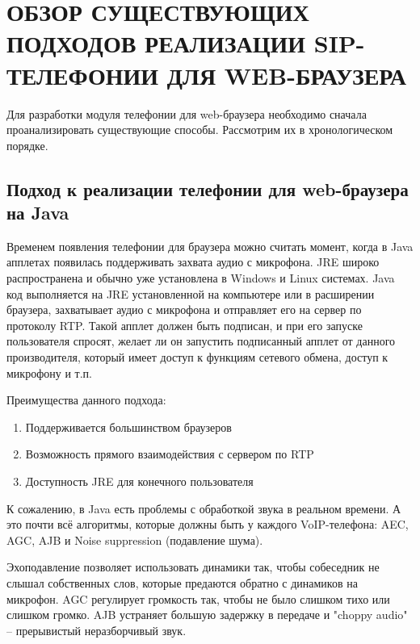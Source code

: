 \chapter{ОБЗОР СУЩЕСТВУЮЩИХ ПОДХОДОВ РЕАЛИЗАЦИИ SIP-ТЕЛЕФОНИИ ДЛЯ WEB-БРАУЗЕРА}
\label{chapter:analysis}

Для разработки модуля телефонии для web-браузера необходимо сначала проанализировать существующие способы. Рассмотрим их в хронологическом порядке.

\section{Подход к реализации телефонии для web-браузера на Java}

Временем появления телефонии для браузера можно считать момент, когда в Java апплетах появилась поддерживать захвата аудио с микрофона. JRE широко распространена и обычно уже установлена в Windows и Linux системах.\cite{webrtc_flash_java} Java код выполняется на JRE установленной на компьютере или в расширении браузера, захватывает аудио с микрофона и отправляет его на сервер по протоколу RTP. Такой апплет должен быть подписан, и при его запуске пользователя спросят, желает ли он запустить подписанный апплет от данного производителя, который имеет доступ к функциям сетевого обмена, доступ к микрофону и т.п.

Преимущества данного подхода:
\begin{enumerate}
\item Поддерживается большинством браузеров
\item Возможность прямого взаимодействия с сервером по RTP
\item Доступность JRE для конечного пользователя
\end{enumerate}

К сожалению, в Java есть проблемы с обработкой звука в реальном времени. А это почти всё алгоритмы, которые должны быть у каждого VoIP-телефона: AEC, AGC, AJB и Noise suppression (подавление шума).

Эхоподавление позволяет использовать динамики так, чтобы собеседник не слышал собственных слов, которые предаются обратно с динамиков на микрофон. AGC регулирует громкость так, чтобы не было слишком тихо или слишком громко. AJB устраняет большую задержку в передаче и "choppy audio" – прерывистый неразборчивый звук.

